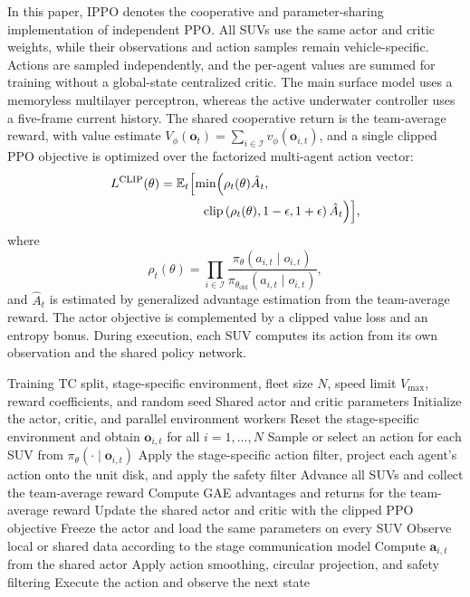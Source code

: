 \documentclass[a4paper,fleqn]{cas-dc}
\begin{document}
In this paper, IPPO denotes the cooperative and parameter-sharing implementation
of independent PPO. All SUVs use the same actor and critic weights, while their
observations and action samples remain vehicle-specific. Actions are sampled
independently, and the per-agent values are summed for training without a
global-state centralized critic. The main surface model uses a memoryless
multilayer perceptron, whereas the active underwater controller uses a
five-frame current history. The shared cooperative return is the team-average
reward, with value estimate
\(V_\phi(\mathbf{o}_t)=\sum_{i\in\mathcal{I}}
v_\phi(\mathbf{o}_{i,t})\), and a single clipped PPO objective is optimized
over the factorized multi-agent action vector:
\begin{equation}
\begin{aligned}
L^{\mathrm{CLIP}}(\theta)
={}&\mathbb{E}_t\Bigl[
\min\Bigl(
\rho_t(\theta)\hat A_t,\\
&\qquad
\operatorname{clip}
\left(\rho_t(\theta),1-\epsilon,1+\epsilon\right)
\hat A_t
\Bigr)\Bigr],
\end{aligned}
\label{eq:ppo}
\end{equation}
where
\begin{equation}
\rho_t(\theta)=
\prod_{i\in\mathcal{I}}
\frac{\pi_\theta(a_{i,t}\mid o_{i,t})}
{\pi_{\theta_{\mathrm{old}}}(a_{i,t}\mid o_{i,t})},
\label{eq:ratio}
\end{equation}
and $\hat A_t$ is estimated by generalized advantage estimation from the
team-average reward. The actor objective is complemented by a clipped value
loss and an entropy bonus. During execution, each SUV computes its action from
its own observation and the shared policy network.

\begin{algorithm*}[t]
\caption{Training and deployment of parameter-sharing IPPO}
\label{alg:ippo_training}
\begin{algorithmic}[1]
\REQUIRE Training TC split, stage-specific environment, fleet size $N$,
speed limit $V_{\max}$, reward coefficients, and random seed
\ENSURE Shared actor and critic parameters
\STATE Initialize the actor, critic, and parallel environment workers
  \STATE Reset the stage-specific environment and obtain
  $\mathbf{o}_{i,t}$ for all $i=1,\ldots,N$
    \STATE Sample or select an action for each SUV from
    $\pi_\theta(\cdot\mid\mathbf{o}_{i,t})$
\STATE Apply the stage-specific action filter, project each agent's action
onto the unit disk, and apply the safety filter
    \STATE Advance all SUVs and collect the team-average reward
  \ENDFOR
  \STATE Compute GAE advantages and returns for the team-average reward
  \STATE Update the shared actor and critic with the clipped PPO objective
\ENDFOR
\STATE Freeze the actor and load the same parameters on every SUV
  \STATE Observe local or shared data according to the stage communication model
  \STATE Compute $\mathbf{a}_{i,t}$ from the shared actor
\STATE Apply action smoothing, circular projection, and safety filtering
  \STATE Execute the action and observe the next state
\ENDFOR
\end{algorithmic}
\end{algorithm*}
\end{document}
